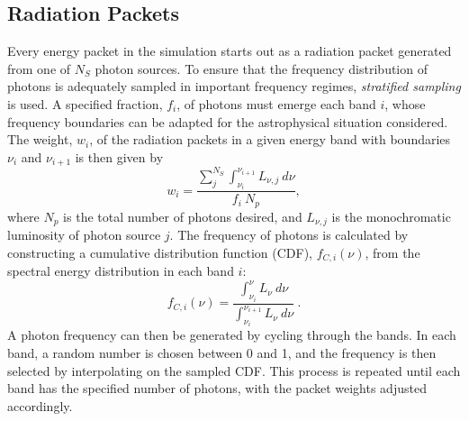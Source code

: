 \subsection{Radiation Packets}
\label{sec:packets}
Every energy packet in the simulation starts out as a radiation packet generated
from one of $N_S$ photon sources. To ensure that the frequency distribution
of photons is adequately sampled in important frequency regimes, 
{\em stratified sampling} is used. A specified fraction, $f_i$,
of photons must emerge each band $i$, whose frequency boundaries
can be adapted for the astrophysical situation considered. 
The weight, $w_i$, of the radiation packets in a given energy band with boundaries
$\nu_i$ and $\nu_{i+1}$ is then given by
\begin{equation}
w_i = \frac{\sum_j^{N_S} \int_{\nu_i}^{\nu_{i+1}} L_{\nu,j}~d\nu}{f_i~N_p},
\end{equation}
where $N_p$ is the total number of photons desired, 
and $L_{\nu,j}$ is the monochromatic 
luminosity of photon source $j$. 
The frequency of photons is calculated by constructing a 
cumulative distribution function (CDF), $f_{C,i}(\nu)$,
from the spectral energy distribution in each band $i$: 
\begin{equation}
f_{C,i} (\nu) = 
\frac{\int_{\nu_i}^{\nu} L_\nu~d\nu}
{\int_{\nu_i}^{\nu_{i+1}} L_\nu~d\nu} ~.
\end{equation}
A photon frequency can then be generated by cycling through the bands. In each band,
a random number is chosen between 0 and 1, and the frequency is 
then selected by interpolating on the sampled CDF. This process is repeated until 
each band has the specified number of photons, with the packet
weights adjusted accordingly.

